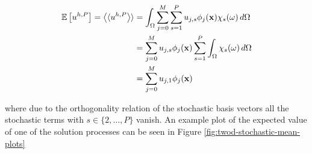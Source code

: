 \begin{align}
  \begin{split}
    \mathbb{E}\left[u^{h,P}\right] = \left\langle\langle u^{h,P}\right\rangle\rangle
      &= \int_\Omega\sum_{j=0}^M\sum_{s=1}^Pu_{j,s}\phi_j(\mathbf{x})\chi_s(\omega)\, d\Omega \\
      &= \sum_{j=0}^Mu_{j,s}\phi_j(\mathbf{x})\sum_{s=1}^P\int_\Omega\chi_s(\omega)\, d\Omega \\
      &= \sum_{j=0}^Mu_{j,1}\phi_j(\mathbf{x})
  \end{split}
\end{align}

where due to the orthogonality relation of the stochastic basis vectors all the
stochastic terms with $s \in \{2, \ldots, P\}$ vanish. An example plot of the
expected value of one of the solution processes can be seen in Figure
\ref{fig:twod-stochastic-mean-plots}

